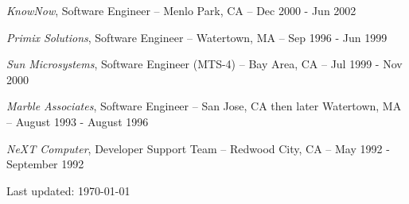 \documentclass[letterpaper]{article}
\renewenvironment{itemize}{
  \begin{list}{}{
    \setlength{\leftmargin}{1.5em}
  }
}{
  \end{list}
}
\begin{document}
\begin{itemize}
\item {\it KnowNow}, Software Engineer -- Menlo Park, CA -- Dec 2000 - Jun 2002

\item {\it Primix Solutions}, Software Engineer -- Watertown, MA -- Sep 1996 - Jun 1999

\item {\it Sun Microsystems}, Software Engineer (MTS-4) -- Bay Area, CA -- Jul 1999 - Nov 2000

\item {\it Marble Associates}, Software Engineer -- San Jose, CA then later Watertown, MA -- August 1993 - August 1996

\item {\it NeXT Computer}, Developer Support Team -- Redwood City, CA -- May 1992 - September 1992

\end{itemize}

\bigskip

\begin{center}
  \begin{footnotesize}
    Last updated: \today \\
  \end{footnotesize}
\end{center}
\end{document}
